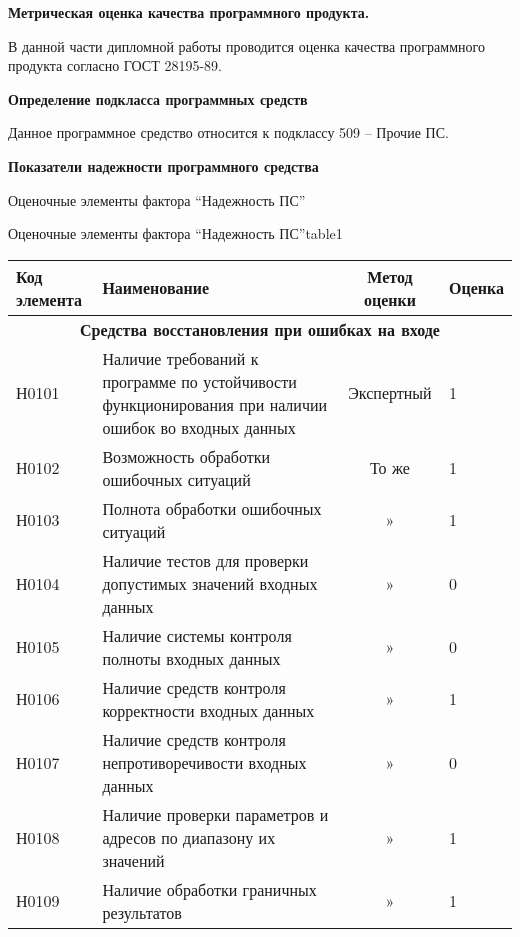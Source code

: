 \textbf{Метрическая оценка качества программного продукта.}

В данной части дипломной работы проводится оценка качества программного продукта согласно ГОСТ 28195-89.

\textbf{Определение подкласса программных средств}

Данное программное средство относится к подклассу 509 – Прочие ПС.

\textbf{Показатели надежнос­ти программного средства}

Оценочные элементы фактора “Надежность ПС”

\begin{ztable}{Оценочные элементы фактора “Надежность ПС”}{table1}
  \begin{tabularx}{\textwidth}{|l|X|c|l|}
    \hline
    Код элемента & Наименование & Метод оценки & Оценка\\

    \hline
    \multicolumn{4}{|c|}{\textbf{Средства восстановления при ошибках на входе}} \\

    \hline
    Н0101 & Наличие требований к программе по устойчивости функционирования при на­личии ошибок во входных данных  & Экспертный & 1 \\

    \hline
    Н0102 & Возможность обработки ошибочных ситуаций & То же & 1 \\

    \hline
    Н0103 & Полнота обработки оши­бочных ситуаций & » & 1 \\

    \hline
    Н0104 & Наличие тестов для про­верки допустимых значений входных данных & » & 0 \\

    \hline
    Н0105 & Наличие системы контро­ля полноты входных дан­ных & » & 0 \\

    \hline
    Н0106 & Наличие средств контро­ля корректности входных данных & » & 1 \\

    \hline
    Н0107 & Наличие средств контро­ля непротиворечивости входных данных & » & 0 \\

    \hline
    Н0108 & Наличие проверки пара­метров и адресов по диа­пазону их значений & » & 1 \\
    Н0109 & Наличие обработки гра­ничных результатов & » & 1 \\


\end{tabularx}
\end{ztable}
